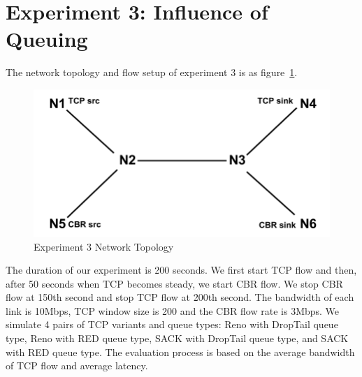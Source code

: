 \documentclass[10pt, conference]{lib/IEEEtran}
\begin{document}
\section{Experiment 3: Influence of Queuing}
The network topology and flow setup of experiment 3 is as figure~\ref{fig:exp3_tpg}.
\begin{figure}[!htb]
    \centering
    \includegraphics[width=0.8\linewidth]{images/exp3-tpg.png}
    \caption{Experiment 3 Network Topology}
    \label{fig:exp3_tpg}
\end{figure}
The duration of our experiment is 200 seconds. We first start TCP flow and then, after 50 seconds when TCP becomes 
steady, we start CBR flow. We stop CBR flow at 150th second and stop TCP flow at 200th second. The bandwidth of 
each link is 10Mbps, TCP window size is 200 and the CBR flow rate is 3Mbps. We simulate 4 pairs of TCP variants 
and queue types: Reno with DropTail queue type, Reno with RED queue type, SACK with DropTail queue type, and SACK 
with RED queue type. The evaluation process is based on the average bandwidth of TCP flow and average latency.
\end{document}
